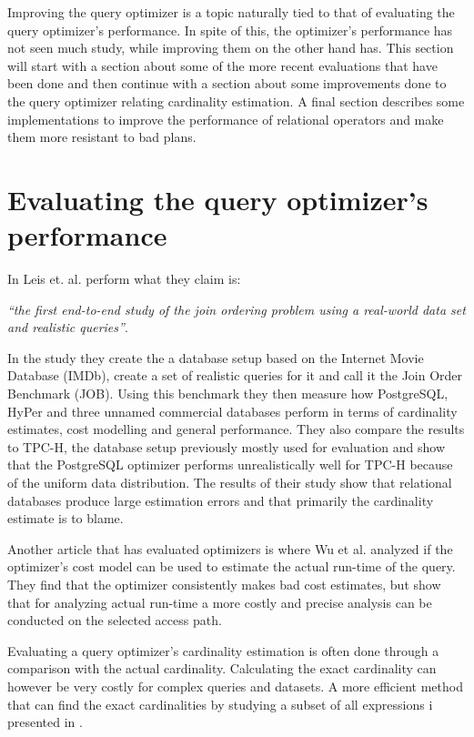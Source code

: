 Improving the query optimizer is a topic naturally tied to that of evaluating the query optimizer's performance. In spite of this, the optimizer's performance has not seen much study, while improving them on the other hand has. This section will start with a section about some of the more recent evaluations that have been done and then continue with a section about some improvements done to the query optimizer relating cardinality estimation. A final section describes some implementations to improve the performance of relational operators and make them more resistant to bad plans.

\section{Evaluating the query optimizer's performance}
In \cite{leis_2015_how_hgaqor} Leis et. al. perform what they claim is:

\textit{``the first end-to-end study of the join ordering problem using a real-world data set and realistic queries''}.

In the study they create the a database setup based on the Internet Movie Database (IMDb), create a set of realistic queries for it and call it the Join Order Benchmark (JOB). Using this benchmark they then measure how PostgreSQL, HyPer and three unnamed commercial databases perform in terms of cardinality estimates, cost modelling and general performance. They also compare the results to TPC-H, the database setup previously mostly used for evaluation and show that the PostgreSQL optimizer performs unrealistically well for TPC-H because of the uniform data distribution. The results of their study show that relational databases produce large estimation errors and that primarily the cardinality estimate is to blame.

Another article that has evaluated optimizers is \cite{wu_2013_predicting_pqetaocmru} where Wu et al. analyzed if the optimizer's cost model can be used to estimate the actual run-time of the query. They find that the optimizer consistently makes bad cost estimates, but show that for analyzing actual run-time a more costly and precise analysis can be conducted on the selected access path.

Evaluating a query optimizer's cardinality estimation is often done through a comparison with the actual cardinality. Calculating the exact cardinality can however be very costly for complex queries and datasets. A more efficient method that can find the exact cardinalities by studying a subset of all expressions i presented in \cite{chaudhuri_2009_exact_ecqofot}.

